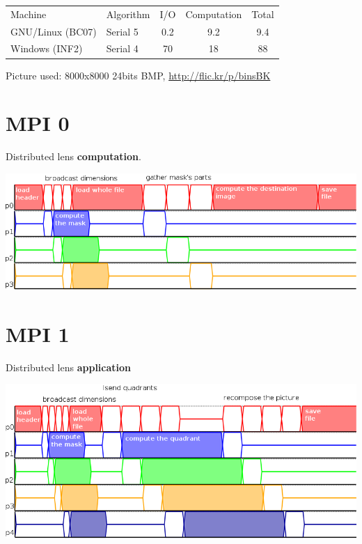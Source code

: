 \documentclass[12pt]{article}
\begin{document}
\vspace{3cm}
\begin{center}
\begin{tabular}{ l | l | c | c  || c}
    Machine & Algorithm & I/O & Computation & Total \\
    \noalign{\medskip}
    \hline \hline
    \noalign{\medskip}
    GNU/Linux (BC07) & Serial 5 & 0.2 & 9.2 & 9.4 \\
    \noalign{\medskip}
    \hline
    \noalign{\medskip}
    Windows (INF2) & Serial 4 & 70 & 18 & 88 \\
\end{tabular}
\end{center}

\vspace{3cm}
\small Picture used: 8000x8000 24bits BMP, \url{http://flic.kr/p/binsBK}

\section{MPI 0}

Distributed lens \textbf{computation}.

\begin{center}
\includegraphics[width=.8\textwidth]{../figures/mpi0.png}
\end{center}

\section{MPI 1}

Distributed lens \textbf{application}

\begin{center}
\includegraphics[width=.8\textwidth]{../figures/mpi1.png}
\end{center}
\end{document}
